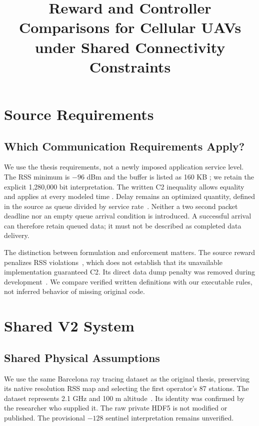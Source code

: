 \documentclass[conference]{IEEEtran}
\title{Reward and Controller Comparisons for Cellular UAVs under Shared Connectivity Constraints}
\author{\IEEEauthorblockN{Guillem Moreno Garcia and Evgenii Vinogradov}
\IEEEauthorblockA{Universitat Polit\`ecnica de Catalunya, Barcelona, Spain\\Research draft, 14 September 2026}}
\begin{document}
\raggedbottom
\maketitle

\section{Source Requirements}
\subsection{Which Communication Requirements Apply?}
We use the thesis requirements, not a newly imposed application service level.
The RSS minimum is $-96$ dBm and the buffer is listed as 160 KB
\cite[p.~15, Table~3]{thesis}; we retain the explicit 1,280,000 bit interpretation.
The written C2 inequality allows equality and applies at every modeled time
\cite[p.~11, Eq.~(12)]{thesis}. Delay remains an optimized quantity, defined in
the source as queue divided by service rate~\cite[p.~9, Eq.~(4)]{thesis}.
Neither a two second packet deadline nor an empty queue arrival condition is
introduced. A successful arrival can therefore retain queued data; it must not
be described as completed data delivery.

The distinction between formulation and enforcement matters. The source reward
penalizes RSS violations~\cite[p.~12, Eq.~(14)]{thesis}, which does not establish
that its unavailable implementation guaranteed C2. Its direct data dump penalty
was removed during development~\cite[pp.~20--21, Sec.~7.3]{thesis}. We compare
verified written definitions with our executable rules, not inferred behavior
of missing original code.

\section{Shared V2 System}
\subsection{Shared Physical Assumptions}
We use the same Barcelona ray tracing dataset as the original thesis,
preserving its native resolution RSS map and selecting the first operator's
87 stations. The dataset represents 2.1 GHz and 100 m
altitude~\cite[p.~7, Table~2; p.~15, Table~3]{thesis}.
Its identity was confirmed by the researcher who supplied it. The raw private
HDF5 is not modified or published. The provisional $-128$ sentinel
interpretation remains unverified.
\end{document}
